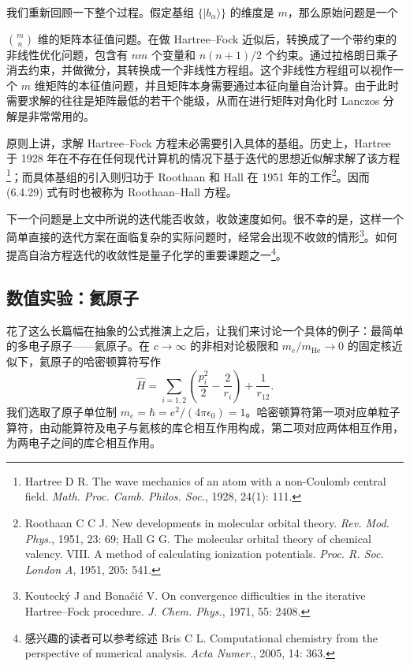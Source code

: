 我们重新回顾一下整个过程。假定基组 $\{|b_\alpha\rangle\}$ 的维度是 $m$，那么原始问题是一个

$\binom{m}{n}$ 维的矩阵本征值问题。在做 Hartree--Fock 近似后，转换成了一个带约束的非线性优化问题，包含有 $nm$ 个变量和 $n(n+1)/2$ 个约束。通过拉格朗日乘子消去约束，并做微分，其转换成一个非线性方程组。这个非线性方程组可以视作一个 $m$ 维矩阵的本征值问题，并且矩阵本身需要通过本征向量自治计算。由于此时需要求解的往往是矩阵最低的若干个能级，从而在进行矩阵对角化时 Lanczos 分解是非常常用的。

原则上讲，求解 Hartree--Fock 方程未必需要引入具体的基组。历史上，Hartree 于 1928 年在不存在任何现代计算机的情况下基于迭代的思想近似解求解了该方程\footnote{Hartree D R. The wave mechanics of an atom with a non-Coulomb central field. \emph{Math. Proc. Camb. Philos. Soc.}, 1928, 24(1): 111.}；而具体基组的引入则归功于 Roothaan 和 Hall 在 1951 年的工作\footnote{Roothaan C C J. New developments in molecular orbital theory. \emph{Rev. Mod. Phys.}, 1951, 23: 69; Hall G G. The molecular orbital theory of chemical valency. VIII. A method of calculating ionization potentials. \emph{Proc. R. Soc. London A}, 1951, 205: 541.}。因而 (6.4.29) 式有时也被称为 Roothaan--Hall 方程。

下一个问题是上文中所说的迭代能否收敛，收敛速度如何。很不幸的是，这样一个简单直接的迭代方案在面临复杂的实际问题时，经常会出现不收敛的情形\footnote{Koutecký J and Bonačić V. On convergence difficulties in the iterative Hartree--Fock procedure. \emph{J. Chem. Phys.}, 1971, 55: 2408.}。如何提高自治方程迭代的收敛性是量子化学的重要课题之一\footnote{感兴趣的读者可以参考综述 Bris C L. Computational chemistry from the perspective of numerical analysis. \emph{Acta Numer.}, 2005, 14: 363.}。

\subsection{数值实验：氦原子}

花了这么长篇幅在抽象的公式推演上之后，让我们来讨论一个具体的例子：最简单的多电子原子——氦原子。在 $c\to\infty$ 的非相对论极限和 $m_e/m_{\mathrm{He}}\to0$ 的固定核近似下，氦原子的哈密顿算符写作
\begin{equation}
 \hat H=\sum_{i=1,2}\left(\frac{p_i^2}{2}-\frac{2}{r_i}\right)+\frac1{r_{12}}.
\tag{6.4.32}
\end{equation}
我们选取了原子单位制 $m_e=\hbar=e^2/(4\pi\epsilon_0)=1$。哈密顿算符第一项对应单粒子算符，由动能算符及电子与氦核的库仑相互作用构成，第二项对应两体相互作用，为两电子之间的库仑相互作用。

